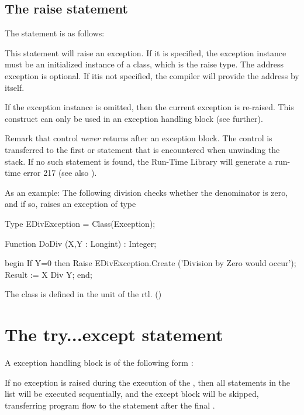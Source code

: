 \documentclass{report}
\begin{document}
\subsection{The raise statement}

The  statement is as follows:



This statement will raise an exception. If it is specified, the exception 
instance must be an initialized instance of a class, which is the raise 
type. The address exception is optional. If itis not specified, the compiler
will provide the address by itself.

If the exception instance is omitted, then the current exception is
re-raised. This construct can only be used in an exception handling
block (see further).

Remark that control {\em never} returns after an exception block. The
control is transferred to the first  or 
 statement that is encountered when unwinding the stack.
If no such statement is found, the \fpc Run-Time Library will generate a
run-time error 217 (see also ).

As an example: The following division checks whether the denominator is
zero, and if so, raises an exception of type 

\begin{listing}
Type EDivException = Class(Exception);

Function DoDiv (X,Y : Longint) : Integer;

begin
  If Y=0 then 
    Raise EDivException.Create ('Division by Zero would occur');
  Result := X Div Y;
end;
\end{listing}
The class  is defined in the  unit of the rtl.
()

\section{The try...except statement}

A  exception handling block is of the following form :



If no exception is raised during the execution of the ,
then all statements in the list will be executed sequentially, and the
except block will be skipped, transferring program flow to the statement
after the final .
\end{document}
